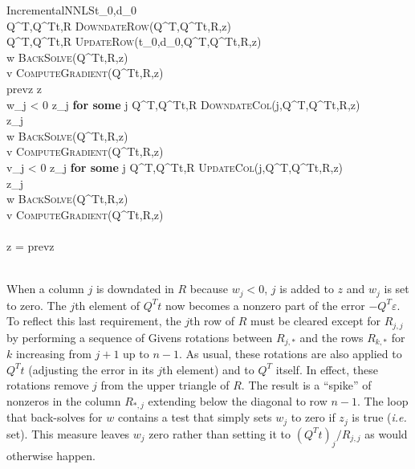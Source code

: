\begin{pseudocode}{IncrementalNNLS}{t_0,d_0}
                              \\
Q^T,Q^Tt,R \GETS \textsc{DowndateRow}(Q^T,Q^Tt,R,z)         \\
Q^T,Q^Tt,R \GETS \textsc{UpdateRow}(t_0,d_0,Q^T,Q^Tt,R,z)   \\
w \GETS \textsc{BackSolve}(Q^Tt,R,z)                        \\
v \GETS \textsc{ComputeGradient}(Q^Tt,R,z)                  \\
\REPEAT     
  prevz \GETS z                                             \\
  \IF w_j < 0 \AND \not z_j \textbf{ for some }j \THEN
  \BEGIN
    Q^T,Q^Tt,R \GETS \textsc{DowndateCol}(j,Q^T,Q^Tt,R,z)   \\
    z_j \GETS \TRUE                                         \\
    w \GETS \textsc{BackSolve}(Q^Tt,R,z)                    \\
    v \GETS \textsc{ComputeGradient}(Q^Tt,R,z)              \\
  \END
  \ELSEIF v_j < 0 \AND z_j \textbf{ for some }j \THEN
  \BEGIN
    Q^T,Q^Tt,R \GETS \textsc{UpdateCol}(j,Q^T,Q^Tt,R,z)     \\
    z_j \GETS \FALSE                                        \\
    w \GETS \textsc{BackSolve}(Q^Tt,R,z)                    \\
    v \GETS \textsc{ComputeGradient}(Q^Tt,R,z)              \\
  \END                                                      \\
\UNTIL z = prevz                                            \\ 
                                                \\     
\end{pseudocode}
 
When a column $j$ is downdated in $R$ because $w_j < 0$, $j$ is added to $z$ and $w_j$ is set to zero.
The $j$th element of $Q^Tt$ now becomes a nonzero part of the error $-Q^T\varepsilon$.
To reflect this last requirement, the $j$th row of $R$ must be cleared except for $R_{j,j}$ by performing
a sequence of Givens rotations between $R_{j,*}$ and the rows $R_{k,*}$ for $k$ increasing from $j+1$ up to $n-1$.
As usual, these rotations are also applied to $Q^Tt$ (adjusting the error in its $j$th element) and to $Q^T$ itself.
In effect, these rotations remove $j$ from the upper triangle of $R$.
The result is a ``spike'' of nonzeros in the column $R_{*,j}$ extending below the diagonal to row $n-1$.
The loop that back-solves for $w$ contains a test that simply sets $w_j$ to zero if $z_j$ is true (\emph{i.e.} set).
This measure leaves $w_j$ zero rather than setting it to $(Q^Tt)_j/R_{j,j}$ as would otherwise happen.

